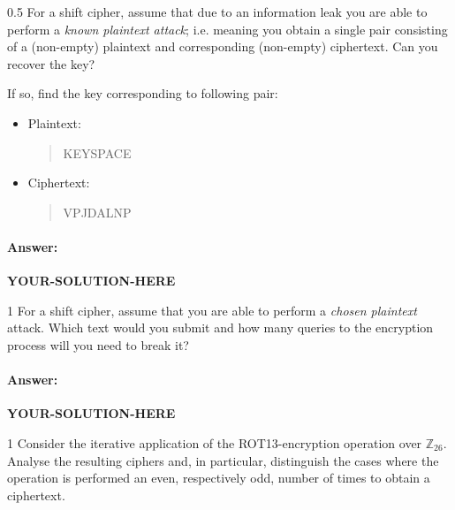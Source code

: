 \documentclass[]{scrartcl}
\newcommand{\ZZ}{\mathbb{Z}}
\newcounter{exercise}
\newcounter{qid}[section]
\newcommand{\exerciseprefix}{prefix}
\newcommand{\questiontitle}{Questions}
\newcommand{\blockid}{B2}
\newcommand{\exname}{}
\newcommand{\yoursolutionhere}{\textbf{YOUR-SOLUTION-HERE}}
\begin{document}
\renewcommand{\exerciseprefix}{PS-\blockid{}-E\theexercise: \exname{}-Q\theqid}
\renewcommand{\questiontitle}{\exerciseprefix{}: Attacking shift cipher}
\begin{exercisebox}{0.5}
  For a shift cipher, assume that due to an information leak you are able to perform a \emph{known plaintext attack}; i.e. meaning you obtain a single pair consisting of a (non-empty) plaintext and corresponding (non-empty) ciphertext. Can you recover the key?

  If so, find the key corresponding to following pair:
  \begin{itemize}
      \item Plaintext:
      \begin{quote}
          KEYSPACE
      \end{quote}
      \item Ciphertext:
      \begin{quote}
          VPJDALNP
      \end{quote}
  \end{itemize}
\end{exercisebox}

\paragraph{Answer:} \yoursolutionhere{}



\renewcommand{\exerciseprefix}{PS-\blockid{}-E\theexercise: \exname{}-Q\theqid}
\renewcommand{\questiontitle}{\exerciseprefix{}: Attacking shift cipher}
\begin{exercisebox}{1}
  For a shift cipher, assume that you are able to perform a \emph{chosen plaintext} attack. Which text would you submit and how many queries to the encryption process will you need to break it?
\end{exercisebox}

\paragraph{Answer:} \yoursolutionhere{}




\renewcommand{\exerciseprefix}{PS-\blockid{}-E\theexercise: \exname-Q\theqid}
\renewcommand{\questiontitle}{\exerciseprefix{}: ROT13 properties}
\begin{exercisebox}{1}
Consider the iterative application of the ROT13-encryption operation over $\ZZ_{26}$. Analyse the resulting ciphers and, in particular, distinguish the cases where the operation is performed an even, respectively odd, number of times to obtain a ciphertext. 
\end{exercisebox}
\end{document}
